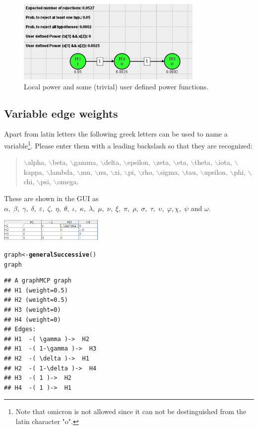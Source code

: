 \documentclass[a4paper, 10pt]{article}\usepackage[]{graphicx}\usepackage[]{color}
\makeatletter
\newcommand{\hlstd}[1]{\textcolor[rgb]{0.345,0.345,0.345}{#1}}%
\newcommand{\hlkwb}[1]{\textcolor[rgb]{0.69,0.353,0.396}{#1}}%
\newcommand{\hlkwd}[1]{\textcolor[rgb]{0.737,0.353,0.396}{\textbf{#1}}}%
\newenvironment{kframe}{%
 \def\at@end@of@kframe{}%
 \ifinner\ifhmode%
  \def\at@end@of@kframe{\end{minipage}}%
  \begin{minipage}{\columnwidth}%
 \fi\fi%
 \def\FrameCommand##1{\hskip\@totalleftmargin \hskip-\fboxsep
 \colorbox{shadecolor}{##1}\hskip-\fboxsep
     \hskip-\linewidth \hskip-\@totalleftmargin \hskip\columnwidth}%
 \MakeFramed {\advance\hsize-\width
   \@totalleftmargin\z@ \linewidth\hsize
   \@setminipage}}%
 {\par\unskip\endMakeFramed%
 \at@end@of@kframe}
\newenvironment{knitrout}{}{} %
\numberwithin{equation}{section}
\theoremstyle{definition}
\theoremstyle{plain}
\renewcommand{\epsilon}{\varepsilon}
\renewcommand{\phi}{\varphi}
\makeatother
\begin{document}
\begin{figure}[ht]
  \centering    
  \includegraphics[width=9cm]{pictures/power.png}      
  \caption{\label{power} Local power and some (trivial) user defined power functions.}
\end{figure}

\subsection{Variable edge weights}

Apart from latin letters the following greek letters can be used to
name a variable\footnote{Note that omicron is not allowed since it can
not be destinguished from the latin character "o".}. Please enter them
with a leading backslash so that they are recognized:

\begin{quote}
  $\backslash$alpha, $\backslash$beta, $\backslash$gamma,
  $\backslash$delta, $\backslash$epsilon, $\backslash$zeta,
  $\backslash$eta, $\backslash$theta, $\backslash$iota,
  $\backslash$kappa, $\backslash$lambda, $\backslash$mu,
  $\backslash$nu, $\backslash$xi,
  $\backslash$pi, $\backslash$rho, $\backslash$sigma, $\backslash$tau,
  $\backslash$upsilon, $\backslash$phi, $\backslash$chi,
  $\backslash$psi, $\backslash$omega.
\end{quote}

These are shown in the GUI as $\alpha,\; \beta,\; \gamma,\; \delta,\;
\epsilon,\; \zeta,\; \eta,\; \theta,\; \iota,\; \kappa,\; \lambda,\;
\mu,\; \nu,\; \xi,\;
\pi,\; \rho,\; \sigma,\; \tau,\; \upsilon,\; \phi, \chi,\; \psi$ and
$\omega$.

\includegraphics[width=5cm]{pictures/variableEditor.png}

\begin{knitrout}\footnotesize
{}\color{fgcolor}\begin{kframe}
\begin{alltt}
\hlstd{graph} \hlkwb{<-} \hlkwd{generalSuccessive}\hlstd{()}
\hlstd{graph}
\end{alltt}
\begin{verbatim}
## A graphMCP graph
## H1 (weight=0.5)
## H2 (weight=0.5)
## H3 (weight=0)
## H4 (weight=0)
## Edges:
## H1  -( \gamma )->  H2 
## H1  -( 1-\gamma )->  H3 
## H2  -( \delta )->  H1 
## H2  -( 1-\delta )->  H4 
## H3  -( 1 )->  H2 
## H4  -( 1 )->  H1
\end{verbatim}
\end{kframe}
\end{knitrout}
\end{document}

